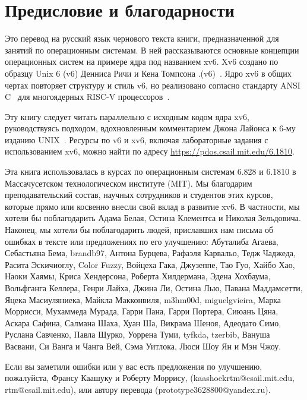 \chapter*{Предисловие и благодарности}

Это перевод на русский язык чернового текста книги, предназначенной для занятий
по операционным системам. В ней рассказываются основные концепции операционных
систем на примере ядра под названием xv6. Xv6 создано по образцу Unix 6 (v6)
Денниса Ричи и Кена Томпсона .(v6)~\cite{unix}. Ядро xv6 в общих чертах
повторяет структуру и стиль v6, но реализовано согласно стандарту ANSI
C~\cite{kernighan} для многоядерных RISC-V процессоров~\cite{kernighan}.

Эту книгу следует читать параллельно с исходным кодом ядра xv6, руководствуясь
подходом, вдохновленным комментарием Джона Лайонса к 6-му изданию
UNIX~\cite{lions}. Ресурсы по v6 и xv6, включая лабораторные задания с
использованием xv6, можно найти по адресу
\url{https://pdos.csail.mit.edu/6.1810}.

Эта книга использовалась в курсах по операционным системам 6.828 и 6.1810 в
Массачусетском технологическом институте (MIT). Мы благодарим преподавательский
состав, научных сотрудников и студентов этих курсов, которые прямо или косвенно
внесли свой вклад в развитие xv6. В частности, мы хотели бы поблагодарить
Адама Белая, Остина Клементса и Николая Зельдовича. Наконец, мы хотели бы
поблагодарить людей, приславших нам письма об ошибках в тексте или предложениях
по его улучшению: Абуталиба Агаева, Себастьяна Бема, brandb97, Антона Бурцева,
Рафаэля Карвальо, Тедж Чаджеда, Расита Эскичиоглу, Color Fuzzy, Войцеха Гака,
Джузеппе, Тао Гуо, Хайбо Хао, Наоки Хаямы, Криса Хендерсона, Роберта Хилдермана,
Эдена Хохбаума, Вольфганга Келлера, Генри Лайха, Джина Ли, Остина Лью,
Павана Маддамсетти, Яцека Масиуляниека, Майкла Макконвиля, m3hm00d,
miguelgvieira, Марка Моррисси, Мухаммеда Мурада, Гарри Пана, Гарри Портера,
Сиюань Цяна, Аскара Сафина, Салмана Шаха, Хуан Ша, Викрама Шеноя,
Адеодато Симо, Руслана Савченко, Павла Щурко, Уоррена Туми, tyfkda, tzerbib,
Вануша Васвани, Си Ванга и Чанга Вей, Сэма Уитлока, Люси Шоу Ян и Мэн Чжоу.

Если вы заметили ошибки или у вас есть предложения по улучшению, пожалуйста,
Франсу Каашуку и Роберту Моррису,
(kaashoekrtm@csail.mit.edu, rtm@csail.mit.edu), или автору перевода
(prototype3628800@yandex.ru).
